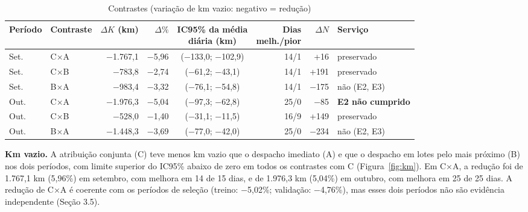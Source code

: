 \begin{table}[!htb]
\caption{Contrastes (variação de km vazio: negativo = redução)}\label{tab:contr}
\centering\fontetabela
\begin{tabular}{@{}llrrcrrl@{}}
\toprule
Período & Contraste & $\Delta K$ (km) & $\Delta\%$ & \shortstack{IC95\% da média\\diária (km)} & \shortstack{Dias\\melh./pior} & $\Delta N$ & Serviço \\
\midrule
Set. & C×A & −1.767,1 & −5,96 & (−133,0; −102,9) & 14/1 & +16 & preservado \\
Set. & C×B & −783,8 & −2,74 & (−61,2; −43,1) & 14/1 & +191 & preservado \\
Set. & B×A & −983,4 & −3,32 & (−76,1; −54,8) & 14/1 & −175 & não (E2, E3) \\
Out. & C×A & −1.976,3 & −5,04 & (−97,3; −62,8) & 25/0 & −85 & \textbf{E2 não cumprido} \\
Out. & C×B & −528,0 & −1,40 & (−31,1; −11,5) & 16/9 & +149 & preservado \\
Out. & B×A & −1.448,3 & −3,69 & (−77,0; −42,0) & 25/0 & −234 & não (E2, E3) \\
\bottomrule
\end{tabular}
\end{table}


\textbf{Km vazio.} A atribuição conjunta (C) teve menos km vazio que o despacho imediato (A) e que o despacho em lotes pelo mais próximo (B) nos dois períodos, com limite superior do IC95\% abaixo de zero em todos os contrastes com C (Figura~\ref{fig:km}). Em C×A, a redução foi de 1.767,1 km (5,96\%) em setembro, com melhora em 14 de 15 dias, e de 1.976,3 km (5,04\%) em outubro, com melhora em 25 de 25 dias. A redução de C×A é coerente com os períodos de seleção (treino: −5,02\%; validação: −4,76\%), mas esses dois períodos não são evidência independente (Seção 3.5).

